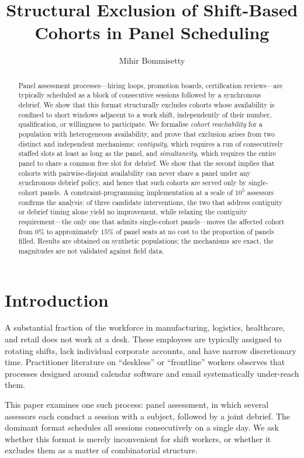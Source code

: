 \documentclass[11pt]{article}
\title{Structural Exclusion of Shift-Based Cohorts in Panel Scheduling}
\author{Mihir Bommisetty}
\date{}
\theoremstyle{definition}
\begin{document}
\maketitle

\begin{abstract}
Panel assessment processes---hiring loops, promotion boards, certification reviews---are
typically scheduled as a block of consecutive sessions followed by a synchronous debrief.
We show that this format structurally excludes cohorts whose availability is confined to
short windows adjacent to a work shift, independently of their number, qualification, or
willingness to participate. We formalise \emph{cohort reachability} for a population with
heterogeneous availability, and prove that exclusion arises from two distinct and
independent mechanisms: \emph{contiguity}, which requires a run of consecutively staffed
slots at least as long as the panel, and \emph{simultaneity}, which requires the entire
panel to share a common free slot for debrief. We show that the second implies that
cohorts with pairwise-disjoint availability can never share a panel under any synchronous
debrief policy, and hence that such cohorts are served only by single-cohort panels. A
constraint-programming implementation at a scale of $10^5$ assessors confirms the
analysis: of three candidate interventions, the two that address contiguity or debrief
timing alone yield no improvement, while relaxing the contiguity requirement---the only
one that admits single-cohort panels---moves the affected cohort from $0\%$ to
approximately $15\%$ of panel seats at no cost to the proportion of panels filled.
Results are obtained on synthetic populations; the mechanisms are exact, the magnitudes
are not validated against field data.
\end{abstract}

\section{Introduction}

A substantial fraction of the workforce in manufacturing, logistics, healthcare, and
retail does not work at a desk. These employees are typically assigned to rotating shifts,
lack individual corporate accounts, and have narrow discretionary time. Practitioner
literature on ``deskless'' or ``frontline'' workers observes that processes designed
around calendar software and email systematically under-reach them.

This paper examines one such process: panel assessment, in which several assessors each
conduct a session with a subject, followed by a joint debrief. The dominant format
schedules all sessions consecutively on a single day. We ask whether this format is
merely inconvenient for shift workers, or whether it excludes them as a matter of
combinatorial structure.
\end{document}

